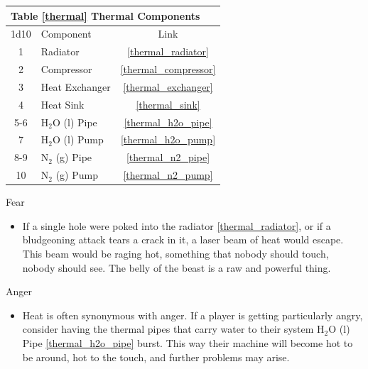 \documentclass[a4paper]{article}
\begin{document}
\vspace{0.5cm} \hspace{0.25\linewidth}
\begin{tabular}{| c | l | c |}
\toprule
\multicolumn{3}{|l|}{Table \ref{thermal} Thermal Components} \\
\toprule
1d10 & Component & Link \\
\midrule
1 & Radiator & \ref{thermal_radiator} \\
2 & Compressor & \ref{thermal_compressor} \\
3 & Heat Exchanger & \ref{thermal_exchanger} \\
4 & Heat Sink & \ref{thermal_sink} \\
\midrule
5-6 & H$_2$O (l) Pipe & \ref{thermal_h2o_pipe} \\
7 & H$_2$O (l) Pump & \ref{thermal_h2o_pump} \\
8-9 & N$_2$ (g) Pipe & \ref{thermal_n2_pipe} \\
10 & N$_2$ (g) Pump & \ref{thermal_n2_pump} \\
\bottomrule
\end{tabular}

\vspace{0.3cm}
\begin{minipage}[t]{0.4\linewidth}
Fear
\begin{itemize}
\item If a single hole were poked into the radiator \ref{thermal_radiator}, or if a bludgeoning attack tears a crack in it, a laser beam of heat would escape. This beam would be raging hot, something that nobody should touch, nobody should see. The belly of the beast is a raw and powerful thing.
\end{itemize}
\end{minipage} 
\begin{minipage}[t]{0.4\linewidth}
Anger
\begin{itemize}
\item Heat is often synonymous with anger. If a player is getting particularly angry, consider having the thermal pipes that carry water to their system H$_2$O (l) Pipe \ref{thermal_h2o_pipe} burst. This way their machine will become hot to be around, hot to the touch, and further problems may arise. 
\end{itemize}
\end{minipage}
\end{document}
